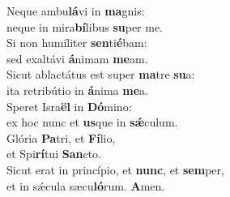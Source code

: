 \evenverse Neque ambu\textbf{lá}vi in \textbf{ma}gnis:~\*\\
\evenverse neque in mira\textbf{bí}libus \textbf{su}per me.\\
\oddverse Si non humíliter \textbf{sen}ti\textbf{é}bam:~\*\\
\oddverse sed exaltávi \textbf{á}nimam \textbf{me}am.\\
\evenverse Sicut ablactátus est super \textbf{ma}tre \textbf{su}a:~\*\\
\evenverse ita retribútio in \textbf{á}nima \textbf{me}a.\\
\oddverse Speret Isra\textbf{ël} in \textbf{Dó}mino:~\*\\
\oddverse ex hoc nunc et \textbf{us}que in \textbf{sǽ}culum.\\
\evenverse Glória \textbf{Pa}tri, et \textbf{Fí}lio,~\*\\
\evenverse et Spi\textbf{rí}tui \textbf{San}cto.\\
\oddverse Sicut erat in princípio, et \textbf{nunc}, et \textbf{sem}per,~\*\\
\oddverse et in sǽcula sæcu\textbf{ló}rum. \textbf{A}men.\\
